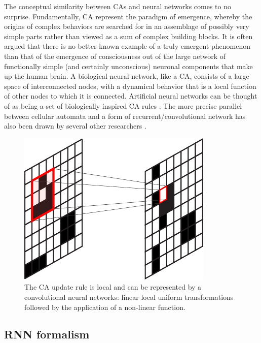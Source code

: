 The conceptual similarity between \acp{CA} and neural networks comes to no
surprise. Fundamentally, \ac{CA} represent the paradigm of emergence, whereby
the origins of complex behaviors are searched for in an assemblage of possibly
very simple parts rather than viewed as a sum of complex building blocks. It is
often argued that there is no better known example of a truly emergent
phenomenon than that of the emergence of consciousness out of the large network
of functionally simple (and certainly unconscious) neuronal components that make
up the human brain. A biological neural network, like a \ac{CA}, consists of a
large space of interconnected nodes, with a dynamical behavior that is a local
function of other nodes to which it is connected. Artificial neural networks can
be thought of as being a set of biologically inspired CA rules
\parencite{ilachinskiCellularAutomataDiscrete2001}. The more precise parallel
between cellular automata and a form of recurrent/convolutional network has also
been drawn by several other researchers
\parencite{wulffLearningCellularAutomaton1993,
  gilpinCellularAutomataConvolutional2018,
  mordvintsevGrowingNeuralCellular2020}.

\begin{figure}[htbp]
  \centering
  \includegraphics[width=.3\linewidth]{figures/ca_cnn}
  \caption{\label{fig:ca_cnn}The CA update rule is local and can be represented
    by a convolutional neural networks: linear local uniform transformations
    followed by the application of a non-linear function.}
\end{figure}

\subsection{RNN formalism}

